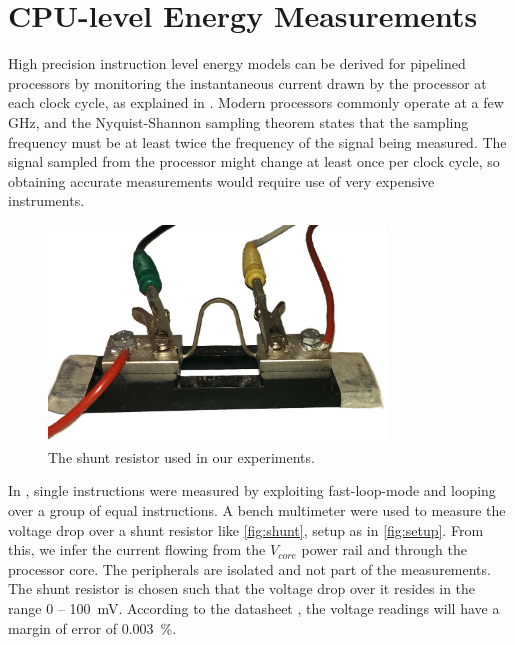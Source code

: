 \section{CPU-level Energy Measurements}
\label{sec:energymeasure}

High precision instruction level energy models can be derived for pipelined
processors by monitoring the instantaneous current drawn by the processor at
each clock cycle, as explained in \cite{nikolaidis2005instruction}. Modern
processors commonly operate at a few GHz, and the Nyquist-Shannon sampling theorem
\cite{nyquist1928certain} states that the sampling frequency must be at least
twice the frequency of the signal being measured. The signal sampled from the
processor might change at least once per clock cycle, so obtaining accurate
measurements would require use of very expensive instruments.

\begin{figure}[tbh]
    \centering
    \includegraphics[width=0.8\textwidth]{figs/shunt.jpg}
    \caption{The shunt resistor used in our experiments.}
    \label{fig:shunt}
\end{figure}

In \cite{rundehvatum2013exploring}, single instructions were measured by
exploiting fast-loop-mode \cite{a9whitepaper} and looping over a group of equal
instructions. A bench multimeter were used to measure the voltage drop over a
shunt resistor like \autoref{fig:shunt}, setup as in \autoref{fig:setup}. From
this, we infer the current flowing from the $V_{core}$ power rail and through
the processor core. The peripherals are isolated and not part of the
measurements. The shunt resistor is chosen such that the voltage drop over it
resides in the range 0 -- 100~mV. According to the datasheet
\cite{agilent34410a}, the voltage readings will have a margin of error of
0.003~\%.

